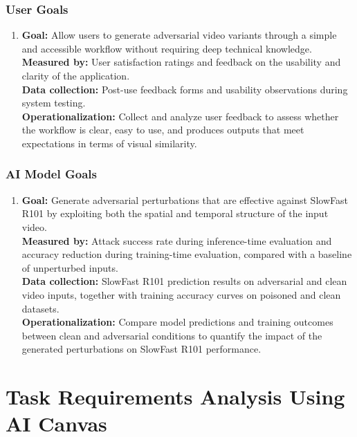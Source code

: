 \subsubsection{User Goals}
\begin{enumerate}
    \item 
    \textbf{Goal:}
    Allow users to generate adversarial video variants through a simple and accessible workflow without requiring deep technical knowledge. \\
    \textbf{Measured by:} 
    User satisfaction ratings and feedback on the usability and clarity of the application. \\
    \textbf{Data collection:}
    Post-use feedback forms and usability observations during system testing. \\
    \textbf{Operationalization:} 
    Collect and analyze user feedback to assess whether the workflow is clear, easy to use, and produces outputs that meet expectations in terms of visual similarity.
\end{enumerate}

\subsubsection{AI Model Goals}
\begin{enumerate}
    \item 
    \textbf{Goal:}
    Generate adversarial perturbations that are effective against SlowFast R101 by exploiting both the spatial and temporal structure of the input video. \\
    \textbf{Measured by:} 
    Attack success rate during inference-time evaluation and accuracy reduction during training-time evaluation, compared with a baseline of unperturbed inputs. \\
    \textbf{Data collection:}
    SlowFast R101 prediction results on adversarial and clean video inputs, together with training accuracy curves on poisoned and clean datasets. \\
    \textbf{Operationalization:} 
    Compare model predictions and training outcomes between clean and adversarial conditions to quantify the impact of the generated perturbations on SlowFast R101 performance.
\end{enumerate}

\section{Task Requirements Analysis Using AI Canvas}
\label{section:task-requirements-analysis-using-AI-canvas}

